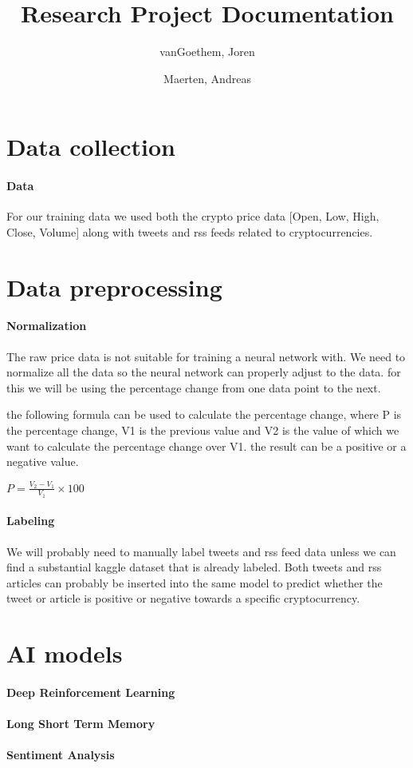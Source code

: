 \documentclass[12pt,a4paper]{article}
\begin{document}
\begin{titlepage}
    \author{
        vanGoethem, Joren 
        \and 
        Maerten, Andreas
    }
    \title{Research Project Documentation}
\end{titlepage}

\maketitle
\newpage
\tableofcontents
\newpage


\section{Data collection}
\paragraph{Data}
    For our training data we used both the crypto price data [Open, Low, High, Close, Volume] along with tweets and rss feeds related to cryptocurrencies.


\section{Data preprocessing}
\paragraph{Normalization}
    The raw price data is not suitable for training a neural network with. We need to normalize all the data so the neural network can properly adjust to the data. for this we will be using the percentage change from one data point to the next.

    the following formula can be used to calculate the percentage change, where P is the percentage change, V1 is the previous value and V2 is the value of which we want to calculate the percentage change over V1. the result can be a positive or a negative value.

    {\large \( P = \frac{ V_2 - V_1 }{ V_1 } \times 100 \)}

\paragraph{Labeling}
    We will probably need to manually label tweets and rss feed data unless we can find a substantial kaggle dataset that is already labeled. Both tweets and rss articles can probably be inserted into the same model to predict whether the tweet or article is positive or negative towards a specific cryptocurrency.


\section{AI models}
\paragraph{Deep Reinforcement Learning}

\paragraph{Long Short Term Memory}

\paragraph{Sentiment Analysis}
\end{document}
